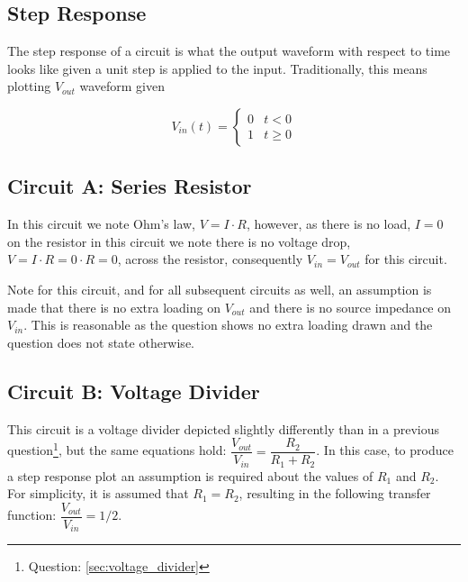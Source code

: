 \documentclass[main.tex]{subfiles}
\begin{document}
\subsection{Step Response}
The step response of a circuit is what the output waveform with respect to time looks like given a unit step is applied to the input. Traditionally, this means plotting $V_{out}$ waveform given 

\[ V_{in}(t) = \begin{cases} 0 & t < 0 \\ 1 & t \geq 0 \end{cases} \]


\subsection{Circuit A: Series Resistor}
In this circuit we note Ohm's law, $V = I \cdot R$, however, as there is no load, $I=0$ on the resistor in this circuit we note there is no voltage drop, $V=I \cdot R=0 \cdot R=0$, across the resistor, consequently $V_{in} = V_{out}$ for this circuit. \newline

\newnoindentpara Note for this circuit, and for all subsequent circuits as well, an assumption is made that there is no extra loading on $V_{out}$ and there is no source impedance on $V_{in}$. This is reasonable as the question shows no extra loading drawn and the question does not state otherwise.

\subsection{Circuit B: Voltage Divider}
This circuit is a voltage divider depicted slightly differently than in a previous question\footnote{Question: \ref{sec:voltage_divider}}, but the same equations hold: $\dfrac{V_{out}}{V_{in}} = \dfrac{R_2}{R_1 + R_2}$. In this case, to produce a step response plot an assumption is required about the values of $R_1$ and $R_2$. For simplicity, it is assumed that $R_1 = R_2$, resulting in the following transfer function: $\dfrac{V_{out}}{V_{in}} = 1/2$.
\end{document}
